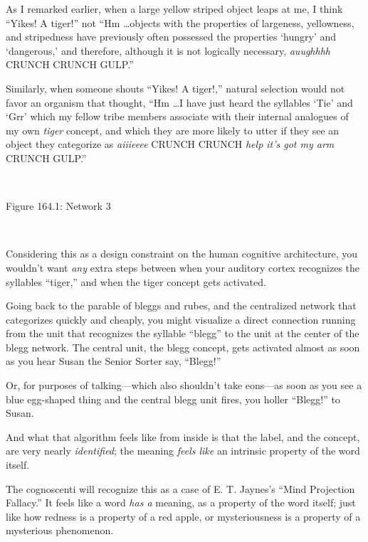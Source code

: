 {
 As I remarked earlier, when a large yellow striped object leaps at
me, I think ``Yikes! A tiger!'' not
``Hm \ldots objects with the properties of largeness,
yellowness, and stripedness have previously often possessed the
properties `hungry' and
`dangerous,' and therefore, although it
is not logically necessary, \textit{auughhhh} CRUNCH CRUNCH
GULP.''}

{
 Similarly, when someone shouts ``Yikes! A
tiger!,'' natural selection would not favor an
organism that thought, ``Hm \ldots I have just heard
the syllables `Tie' and
`Grr' which my fellow tribe members
associate with their internal analogues of my own \textit{tiger}
concept, and which they are more likely to utter if they see an object
they categorize as \textit{aiiieeee} CRUNCH CRUNCH \textit{help
it's got my arm} CRUNCH GULP.''}

{
 ~}

{\centering
{}
 \newline
 Figure 164.1: Network 3
\par}


\bigskip

{
 ~}

{
 Considering this as a design constraint on the human cognitive
architecture, you wouldn't want \textit{any} extra
steps between when your auditory cortex recognizes the syllables
``tiger,'' and when the tiger
concept gets activated.}

{
 Going back to the parable of bleggs and rubes, and the centralized
network that categorizes quickly and cheaply, you might visualize a
direct connection running from the unit that recognizes the syllable
``blegg'' to the unit at the center
of the blegg network. The central unit, the blegg concept, gets
activated almost as soon as you hear Susan the Senior Sorter say,
``Blegg!''}

{
 Or, for purposes of talking---which also shouldn't
take eons---as soon as you see a blue egg-shaped thing and the central
blegg unit fires, you holler
``Blegg!'' to Susan.}

{
 And what that algorithm feels like from inside is that the label,
and the concept, are very nearly \textit{identified}; the meaning
\textit{feels like} an intrinsic property of the word itself.}

{
 The cognoscenti will recognize this as a case of E. T.
Jaynes's ``Mind Projection
Fallacy.'' It feels like a word \textit{has a}
meaning, as a property of the word itself; just like how redness is a
property of a red apple, or mysteriousness is a property of a
mysterious phenomenon.}

